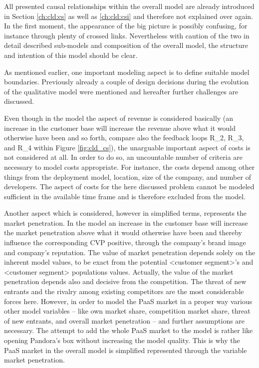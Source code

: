 All presented causal relationships within the overall model are already introduced in Section \ref{ch:cld:cs} as well as \ref{ch:cld:csi} and therefore not explained over again. In the first moment, the appearance of the big picture is possibly confusing, for instance through plenty of crossed links. Nevertheless with caution of the two in detail described sub-models and composition of the overall model, the structure and intention of this model should be clear.

As mentioned earlier, one important modeling aspect is to define suitable model boundaries. Previously already a couple of design decisions during the evolution of the qualitative model were mentioned and hereafter further challenges are discussed.

Even though in the model the aspect of revenue is considered basically (an increase in the customer base will increase the revenue above what it would otherwise have been and so forth, compare also the feedback loops R\_2, R\_3, and R\_4 within Figure \ref{fig:cld_cs}), the unarguable important aspect of costs is not considered at all. In order to do so, an uncountable number of criteria are necessary to model costs appropriate. For instance, the costs depend among other things from the deployment model, location, size of the company, and number of developers. The aspect of costs for the here discussed problem cannot be modeled sufficient in the available time frame and is therefore excluded from the model.

Another aspect which is considered, however in simplified terms, represents the market penetration. In the model an increase in the customer base will increase the market penetration above what it would otherwise have been and thereby influence the corresponding \ac{CVP} positive, through the company's brand image and company's reputation. The value of market penetration depends solely on the inherent model values, to be exact from the potential <customer segment>'s and <customer segment> populations values. Actually, the value of the market penetration depends also and decisive from the competition. The threat of new entrants and the rivalry among existing competitors \citep[pp. 80-82, 85-86]{Porter2008} are the most considerable forces here. However, in order to model the \ac{PaaS} market in a proper way various other model variables -- like own market share, competition market share, threat of new entrants, and overall market penetration -- and further assumptions are necessary. The attempt	 to add the whole \ac{PaaS} market to the model is rather like opening Pandora's box without increasing the model quality. This is why the \ac{PaaS} market in the overall model is simplified represented through the variable market penetration.

